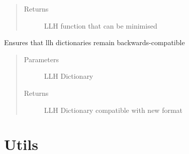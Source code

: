 \documentclass[letterpaper,10pt,english]{sphinxmanual}
\begin{document}
\begin{fulllineitems}
\begin{fulllineitems}
\begin{quote}
\begin{description}
\item[{Returns}] \leavevmode
LLH function that can be minimised

\end{description}\end{quote}

\end{fulllineitems}


\end{fulllineitems}


\begin{fulllineitems}
\label{\detokenize{index:flarestack.core.llh.generate_dynamic_flare_class}}
\end{fulllineitems}


\begin{fulllineitems}
\label{\detokenize{index:flarestack.core.llh.read_llh_dict}}
Ensures that llh dictionaries remain backwards-compatible
\begin{quote}\begin{description}
\item[{Parameters}] \leavevmode
{} \textendash{} LLH Dictionary

\item[{Returns}] \leavevmode
LLH Dictionary compatible with new format

\end{description}\end{quote}

\end{fulllineitems}



\chapter{Utils}
\label{\detokenize{index:utils}}
\end{document}
